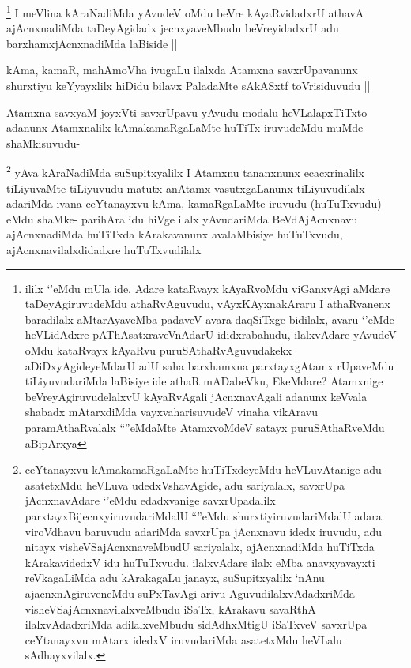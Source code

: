 
\begin{artha}
\footnote{ililx `\stext'eMdu mUla ide, Adare kataRvayx kAyaRvoMdu viGanxvAgi aMdare taDeyAgiruvudeMdu athaRvAguvudu, vAyxKAyxnakAraru I athaRvanenx baradilalx aMtarAyaveMba padaveV avara daqSiTxge bidilalx, avaru `\stext'eMde heVLidAdxre pAThAsatxraveVnAdarU ididxrabahudu, ilalxvAdare yAvudeV oMdu kataRvayx kAyaRvu puruSAthaRvAguvudakekx aDiDxyAgideyeMdarU adU saha barxhamxna parxtayxgAtamx rUpaveMdu tiLiyuvudariMda laBisiye ide athaR mADabeVku, EkeMdare? Atamxnige beVreyAgiruvudelalxvU kAyaRvAgali jAcnxnavAgali adanunx keVvala shabadx mAtarxdiMda vayxvaharisuvudeV vinaha vikAravu paramAthaRvalalx ``\stext''eMdaMte AtamxvoMdeV satayx puruSAthaRveMdu aBipArxya}
I meVlina kAraNadiMda yAvudeV oMdu beVre kAyaRvidadxrU athavA ajAcnxnadiMda taDeyAgidadx jecnxyaveMbudu beVreyidadxrU adu barxhamxjAcnxnadiMda laBiside ||
\end{artha}


\begin{artha}
kAma, kamaR, mahAmoVha ivugaLu ilalxda Atamxna savxrUpavanunx shurxtiyu keYyayxlilx hiDidu bilavx PaladaMte sAkASxtf toVrisiduvudu ||
\end{artha}


\begin{artha}
Atamxna savxyaM joyxVti savxrUpavu yAvudu modalu heVLalapxTiTxto adanunx Atamxnalilx kAmakamaRgaLaMte huTiTx iruvudeMdu muMde shaMkisuvudu-
\end{artha}

\begin{artha}
\footnote{ceYtanayxvu kAmakamaRgaLaMte huTiTxdeyeMdu heVLuvAtanige adu asatetxMdu heVLuva udedxVshavAgide, adu sariyalalx, savxrUpa jAcnxnavAdare `\stext'eMdu edadxvanige savxrUpadalilx parxtayxBijecnxyiruvudariMdalU ``\stext''eMdu shurxtiyiruvudariMdalU adara viroVdhavu baruvudu adariMda savxrUpa jAcnxnavu idedx iruvudu, adu nitayx visheVSajAcnxnaveMbudU sariyalalx, ajAcnxnadiMda huTiTxda kArakavidedxV idu huTuTxvudu. ilalxvAdare ilalx eMba anavxyavayxti reVkagaLiMda adu kArakagaLu janayx, suSupitxyalilx `nAnu ajacnxnAgiruveneMdu suPxTavAgi arivu AguvudilalxvAdadxriMda visheVSajAcnxnavilalxveMbudu iSaTx, kArakavu savaRthA ilalxvAdadxriMda adilalxveMbudu sidAdhxMtigU iSaTxveV savxrUpa ceYtanayxvu mAtarx idedxV iruvudariMda asatetxMdu heVLalu sAdhayxvilalx.}
yAva kAraNadiMda suSupitxyalilx I Atamxnu tananxnunx ecacxrinalilx tiLiyuvaMte tiLiyuvudu matutx anAtamx vasutxgaLanunx tiLiyuvudilalx adariMda ivana ceYtanayxvu kAma, kamaRgaLaMte iruvudu (huTuTxvudu) eMdu shaMke-
parihAra idu hiVge ilalx yAvudariMda BeVdAjAcnxnavu ajAcnxnadiMda huTiTxda kArakavanunx avalaMbisiye huTuTxvudu, ajAcnxnavilalxdidadxre huTuTxvudilalx
\end{artha}

